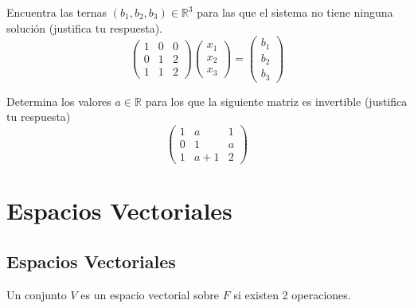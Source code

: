 \documentclass[12pt,a4paper]{book}
\begin{document}
    \begin{ejercicio}
        Encuentra las ternas $(b_{1},b_{2},b_{3})\in\mathbb{R}^{3}$ para las que
        el sistema no tiene ninguna solución (justifica tu respuesta).
        \begin{equation*}
            \begin{pmatrix}
                1 & 0 & 0\\
                0 & 1 & 2\\
                1 & 1 & 2
            \end{pmatrix}
            \begin{pmatrix}
                x_{1}\\
                x_{2}\\
                x_{3}
            \end{pmatrix}
            =
            \begin{pmatrix}
                b_{1}\\
                b_{2}\\
                b_{3}
            \end{pmatrix}
        \end{equation*}
    \end{ejercicio}

    \begin{ejercicio}
        Determina los valores $a\in\mathbb{R}$ para los que la siguiente
        matriz es invertible (justifica tu respuesta)
        \begin{equation*}
            \begin{pmatrix}
                1 & a & 1\\
                0 & 1 & a\\
                1 & a+1 & 2
            \end{pmatrix}
        \end{equation*}
    \end{ejercicio}

    \chapter{Espacios Vectoriales}

    \section{Espacios Vectoriales}

    Un conjunto $V$ es un espacio vectorial sobre $F$ si existen 2 operaciones.
\end{document}
